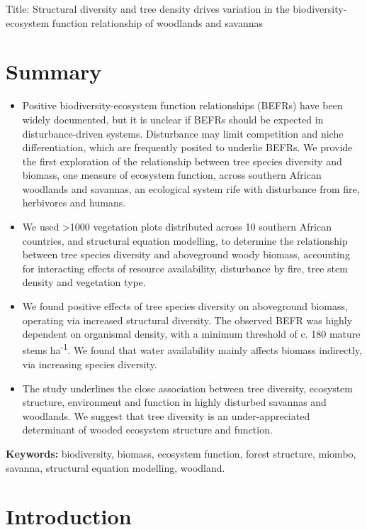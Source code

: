 \documentclass[12pt,a4paper]{article}
\newcommand{\titletext}{Structural diversity and tree density drives variation in the biodiversity-ecosystem function relationship of woodlands and savannas}
\begin{document}
{\Large{Title: \titletext{}}}

\section*{Summary}

\begin{itemize}
	\item{Positive biodiversity-ecosystem function relationships (BEFRs) have been widely documented, but it is unclear if BEFRs should be expected in disturbance-driven systems. Disturbance may limit competition and niche differentiation, which are frequently posited to underlie BEFRs. We provide the first exploration of the relationship between tree species diversity and biomass, one measure of ecosystem function, across southern African woodlands and savannas, an ecological system rife with disturbance from fire, herbivores and humans.}
	\item{We used >1000 vegetation plots distributed across 10 southern African countries, and structural equation modelling, to determine the relationship between tree species diversity and aboveground woody biomass, accounting for interacting effects of resource availability, disturbance by fire, tree stem density and vegetation type.}
	\item{We found positive effects of tree species diversity on aboveground biomass, operating via increased structural diversity. The observed BEFR was highly dependent on organismal density, with a minimum threshold of c. 180 mature stems ha\textsuperscript{-1}. We found that water availability mainly affects biomass indirectly, via increasing species diversity.}
	\item{The study underlines the close association between tree diversity, ecosystem structure, environment and function in highly disturbed savannas and woodlands. We suggest that tree diversity is an under-appreciated determinant of wooded ecosystem structure and function.}
\end{itemize}

\textbf{Keywords:} biodiversity, biomass, ecosystem function, forest structure, miombo, savanna, structural equation modelling, woodland.

\section{Introduction}
\end{document}
